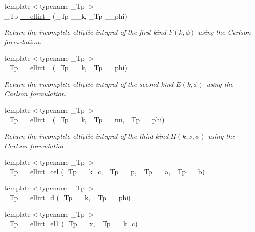 \begin{DoxyCompactItemize}
{\footnotesize template$<$typename \+\_\+\+Tp $>$ }\\\+\_\+\+Tp \hyperlink{namespacestd_1_1____detail_aa349fe5bcf36d29cfacf6cd3e8aa65b0}{\+\_\+\+\_\+ellint\+\_} (\+\_\+\+Tp \+\_\+\+\_\+k, \+\_\+\+Tp \+\_\+\+\_\+phi)
\begin{DoxyCompactList}\small\item\em Return the incomplete elliptic integral of the first kind $ F(k,\phi) $ using the Carlson formulation. \end{DoxyCompactList}\item 
{\footnotesize template$<$typename \+\_\+\+Tp $>$ }\\\+\_\+\+Tp \hyperlink{namespacestd_1_1____detail_ad3687a38e74e5fbf08265501add0b56a}{\+\_\+\+\_\+ellint\+\_} (\+\_\+\+Tp \+\_\+\+\_\+k, \+\_\+\+Tp \+\_\+\+\_\+phi)
\begin{DoxyCompactList}\small\item\em Return the incomplete elliptic integral of the second kind $ E(k,\phi) $ using the Carlson formulation. \end{DoxyCompactList}\item 
{\footnotesize template$<$typename \+\_\+\+Tp $>$ }\\\+\_\+\+Tp \hyperlink{namespacestd_1_1____detail_a9c6ea96cd5d6907fce278010b992499a}{\+\_\+\+\_\+ellint\+\_} (\+\_\+\+Tp \+\_\+\+\_\+k, \+\_\+\+Tp \+\_\+\+\_\+nu, \+\_\+\+Tp \+\_\+\+\_\+phi)
\begin{DoxyCompactList}\small\item\em Return the incomplete elliptic integral of the third kind $ \Pi(k,\nu,\phi) $ using the Carlson formulation. \end{DoxyCompactList}\item 
{\footnotesize template$<$typename \+\_\+\+Tp $>$ }\\\+\_\+\+Tp \hyperlink{namespacestd_1_1____detail_a7c7d04715f0d40e054299312db35e32d}{\+\_\+\+\_\+ellint\+\_\+cel} (\+\_\+\+Tp \+\_\+\+\_\+k\+\_\+c, \+\_\+\+Tp \+\_\+\+\_\+p, \+\_\+\+Tp \+\_\+\+\_\+a, \+\_\+\+Tp \+\_\+\+\_\+b)
\item 
{\footnotesize template$<$typename \+\_\+\+Tp $>$ }\\\+\_\+\+Tp \hyperlink{namespacestd_1_1____detail_a00da42d89830fd51e9934fe0c5e08b7f}{\+\_\+\+\_\+ellint\+\_\+d} (\+\_\+\+Tp \+\_\+\+\_\+k, \+\_\+\+Tp \+\_\+\+\_\+phi)
\item 
{\footnotesize template$<$typename \+\_\+\+Tp $>$ }\\\+\_\+\+Tp \hyperlink{namespacestd_1_1____detail_aa17b1b382a89552f49fbb8c5eda1d50f}{\+\_\+\+\_\+ellint\+\_\+el1} (\+\_\+\+Tp \+\_\+\+\_\+x, \+\_\+\+Tp \+\_\+\+\_\+k\+\_\+c)

\end{DoxyCompactItemize}
